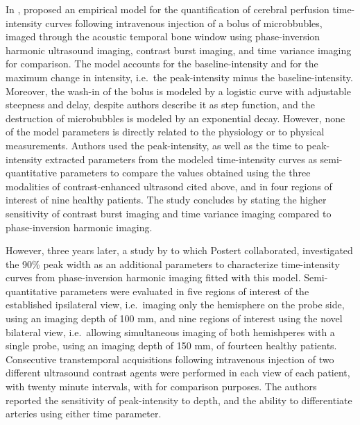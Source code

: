 In \citeyear{Postert:2000kda}, \citet{Postert:2000kda} proposed an empirical model for the quantification of cerebral perfusion time-intensity curves following intravenous injection of a bolus of microbbubles, imaged through the acoustic temporal bone window using phase-inversion harmonic ultrasound imaging, contrast burst imaging, and time variance imaging for comparison. 
The model accounts for the baseline-intensity and for the maximum change in intensity, i.e.~the peak-intensity minus the baseline-intensity. 
Moreover, the wash-in of the bolus is modeled by a logistic curve with adjustable steepness and delay, despite authors describe it as step function, and the destruction of microbubbles is modeled by an exponential decay.
However, none of the model parameters is directly related to the physiology or to physical measurements. 
Authors used the peak-intensity, as well as the time to peak-intensity extracted parameters from the modeled time-intensity curves as semi-quantitative parameters to compare the values obtained using the three modalities of contrast-enhanced ultrasond cited above, and in four regions of interest of nine healthy patients. 
The study concludes by stating the higher sensitivity of contrast burst imaging and time variance imaging compared to phase-inversion harmonic imaging.

However, three years later, a study by \citet{Eyding:2003bo} to which Postert collaborated, investigated the 90\% peak width as an additional parameters to characterize time-intensity curves from phase-inversion harmonic imaging fitted with this model.
Semi-quantitative parameters were evaluated in five regions of interest of the established ipsilateral view, i.e.~imaging only the hemisphere on the probe side, using an imaging depth of 100 mm, and nine regions of interest using the novel bilateral view, i.e.~allowing simultaneous imaging of both hemishperes with a single probe, using an imaging depth of 150 mm, of fourteen healthy patients. 
Consecutive transtemporal acquisitions following intravenous injection of two different ultrasound contrast agents were performed in each view of each patient, with twenty minute intervals, with for comparison purposes.
The authors reported the sensitivity of peak-intensity to depth, and the ability to differentiate arteries using either time parameter.

